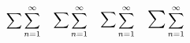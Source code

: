 \documentclass{book}
\begin{document}
\begin{equation*}
\sum\sum^{\infty}_{n=1}\quad
\mathlarger{\sum}\sum^{\infty}_{n=1}\quad
\mathlarger{\mathlarger{\sum}}
\sum^{\infty}_{n=1}\quad
\scalebox{1.6}{$\sum$}\sum^{\infty}_{n=1}
\end{equation*}
\end{document}
